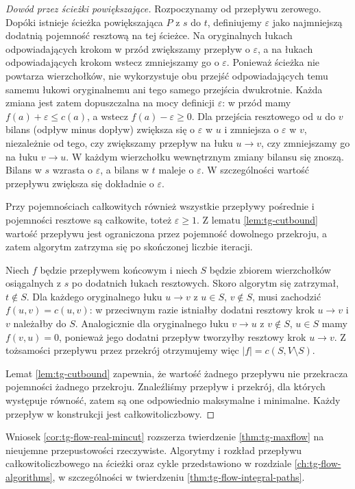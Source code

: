 \begin{proof}[Dowód przez ścieżki powiększające]
Rozpoczynamy od przepływu zerowego. Dopóki istnieje
ścieżka powiększająca $P$ z $s$ do $t$, definiujemy
$\varepsilon$ jako najmniejszą dodatnią pojemność resztową
na tej ścieżce. Na oryginalnych łukach odpowiadających
krokom w przód zwiększamy przepływ o $\varepsilon$,
a na łukach odpowiadających krokom wstecz zmniejszamy
go o $\varepsilon$. Ponieważ ścieżka nie powtarza
wierzchołków, nie wykorzystuje obu przejść odpowiadających
temu samemu łukowi oryginalnemu ani tego samego przejścia
dwukrotnie. Każda zmiana jest zatem dopuszczalna na mocy
definicji $\varepsilon$: w przód mamy $f(a)+\varepsilon
\le c(a)$, a wstecz $f(a)-\varepsilon\ge0$.
Dla przejścia resztowego od $u$ do $v$ bilans
(odpływ minus dopływ) zwiększa się o $\varepsilon$
w $u$ i zmniejsza o $\varepsilon$ w $v$, niezależnie
od tego, czy zwiększamy przepływ na łuku $u\to v$,
czy zmniejszamy go na łuku $v\to u$.
W każdym wierzchołku wewnętrznym zmiany bilansu
się znoszą. Bilans w $s$ wzrasta o $\varepsilon$,
a bilans w $t$ maleje o $\varepsilon$. W szczególności
wartość przepływu zwiększa się dokładnie o $\varepsilon$.

Przy pojemnościach całkowitych również wszystkie przepływy
pośrednie i pojemności resztowe są całkowite, toteż
$\varepsilon\ge1$. Z lematu \ref{lem:tg-cutbound}
wartość przepływu jest ograniczona przez pojemność
dowolnego przekroju, a zatem algorytm zatrzyma się
po skończonej liczbie iteracji.

Niech $f$ będzie przepływem końcowym i niech $S$ będzie
zbiorem wierzchołków osiągalnych z $s$ po dodatnich
łukach resztowych. Skoro algorytm się zatrzymał, $t\notin S$.
Dla każdego oryginalnego łuku $u\to v$ z $u\in S$,
$v\notin S$, musi zachodzić $f(u,v)=c(u,v)$:
w przeciwnym razie istniałby dodatni resztowy krok
$u\to v$ i $v$ należałby do $S$.
Analogicznie dla oryginalnego łuku $v\to u$ z $v\notin S$,
$u\in S$ mamy $f(v,u)=0$, ponieważ jego dodatni przepływ
tworzyłby resztowy krok $u\to v$.
Z tożsamości przepływu przez przekrój otrzymujemy więc
$|f|=c(S,V\setminus S)$.

Lemat \ref{lem:tg-cutbound} zapewnia, że wartość żadnego
przepływu nie przekracza pojemności żadnego przekroju.
Znaleźliśmy przepływ i przekrój, dla których występuje
równość, zatem są one odpowiednio maksymalne i minimalne.
Każdy przepływ w konstrukcji jest całkowitoliczbowy.
\end{proof}

\begin{uwaga}
Wniosek \ref{cor:tg-flow-real-mincut} rozszerza twierdzenie
\ref{thm:tg-maxflow} na nieujemne przepustowości rzeczywiste.
Algorytmy i rozkład przepływu całkowitoliczbowego na ścieżki
oraz cykle przedstawiono w rozdziale \ref{ch:tg-flow-algorithms},
w szczególności w twierdzeniu \ref{thm:tg-flow-integral-paths}.
\end{uwaga}

